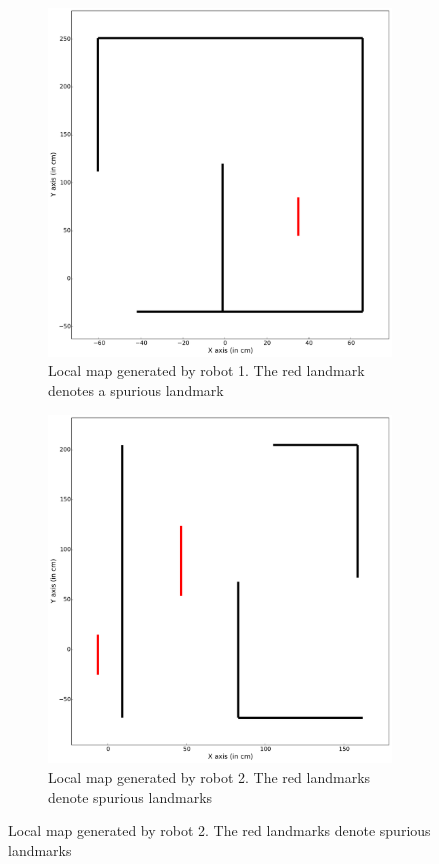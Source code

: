 \begin{figure}
\centering
\begin{subfigure}{0.49\textwidth}
\centering
\includegraphics[scale=0.2]{./images/mmap1}
\caption[Local map generated by robot 1]{Local map generated by robot 1. The red landmark denotes a spurious landmark}
\label{mmap1}
\end{subfigure}
\begin{subfigure}{0.49\textwidth}
\centering
\includegraphics[scale=0.2]{./images/mmap2}
\caption[Local map generated by robot 2]{Local map generated by robot 2. The red landmarks denote spurious landmarks}
\label{mmap2}
\end{subfigure}
\end{figure}

